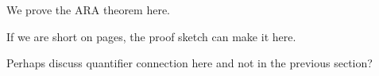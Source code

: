 We prove the ARA theorem here.

If we are short on pages, the proof sketch can make it here.

Perhaps discuss quantifier connection here and not in the previous section?